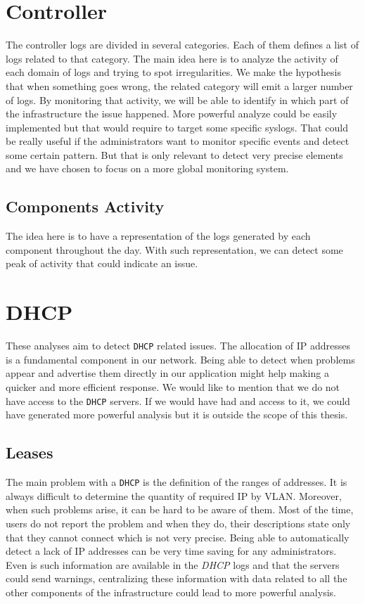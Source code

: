 \section{Controller}
The controller logs are divided in several categories. Each of them defines a list of logs related to that category. The main idea here is to analyze the activity of each domain of logs and trying to spot irregularities. We make the hypothesis that when something goes wrong, the related category will emit a larger number of logs. By monitoring that activity, we will be able to identify in which part of the infrastructure the issue happened. More powerful analyze could be easily implemented but that would require to target some specific syslogs. That could be really useful if the administrators want to monitor specific events and detect some certain pattern. But that is only relevant to detect very precise elements and we have chosen to focus on a more global monitoring system.

\subsection{Components Activity}
The idea here is to have a representation of the logs generated by each component throughout the day. With such representation, we can detect some peak of activity that could indicate an issue.


\section{DHCP}
These analyses aim to detect \texttt{DHCP} related issues. The allocation  of IP addresses is a fundamental component in our network. Being able to detect when problems appear and advertise them directly in our application might help making a quicker and more efficient response. We would like to mention that we do not have access to the \texttt{DHCP} servers. If we would have had and access to it, we could have generated more powerful analysis but it is outside the scope of this thesis.

\subsection{Leases}
The main problem with a \texttt{DHCP} is the definition of the ranges of addresses. It is always difficult to determine the quantity of required IP by VLAN. Moreover, when such problems arise, it can be hard to be aware of them. Most of the time, users do not report the problem and when they do, their descriptions state only that they cannot connect which is not very precise. Being able to automatically detect a lack of IP addresses can be very time saving for any administrators. Even is such information are available in the \emph{DHCP} logs and that the servers could send warnings, centralizing these information with data related to all the other components of the infrastructure could lead to more powerful analysis. 


